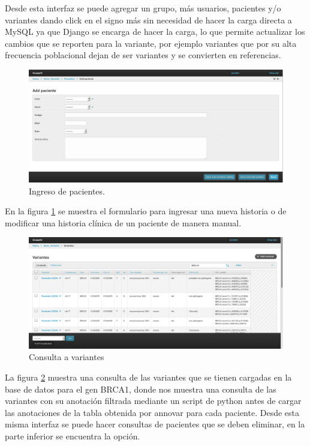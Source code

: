 Desde esta interfaz se puede agregar un grupo, más usuarios, pacientes y/o variantes dando click en el signo más sin necesidad de hacer la carga directa a MySQL ya que Django se encarga de hacer la carga, lo que permite actualizar los cambios que se reporten para la variante, por ejemplo variantes que por su alta frecuencia poblacional dejan de ser variantes y se convierten en referencias.\\

\begin{figure}[h] 
	\centering
	\includegraphics[width=1\textwidth]{Kap3/ingresar_paciente}
	\caption{Ingreso de pacientes.} \label{fig:pacientes}
\end{figure}

En la figura \ref{fig:pacientes} se muestra el formulario para ingresar una nueva historia o de modificar una historia clínica de un paciente de manera manual. \\

\begin{figure}[h] 
	\centering
	\includegraphics[width=1\textwidth]{Kap3/consulta}
	\caption{Consulta a variantes} \label{fig:consulta}
\end{figure}


La figura \ref{fig:consulta} muestra una consulta de las variantes que se tienen cargadas en la base de datos para el gen BRCA1, donde nos muestra una consulta de las variantes con su anotación  filtrada mediante un script de python antes de cargar las anotaciones de la tabla obtenida por annovar para cada paciente. Desde esta misma interfaz se puede hacer consultas de pacientes que se deben eliminar, en la parte inferior se encuentra la opción. \\

